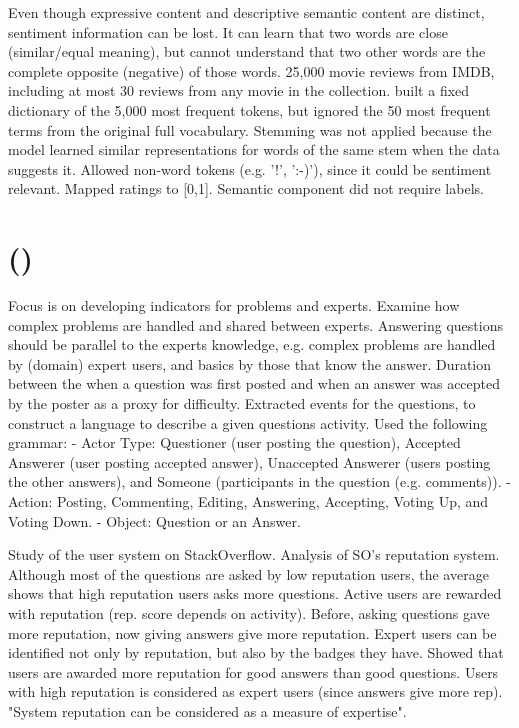 Even though expressive content and descriptive semantic content are distinct, sentiment information can be lost. It can learn that two words are close (similar/equal meaning), but cannot understand that two other words are the complete opposite (negative) of those words.
25,000 movie reviews from IMDB, including at most 30 reviews from any movie in the collection. built a fixed dictionary of the 5,000 most frequent tokens, but ignored the 50 most frequent terms from the original full vocabulary. Stemming was not applied because the model learned similar representations for words of the same stem when the data suggests it. Allowed non-word tokens (e.g. '!', ':-)'), since it could be sentiment relevant. Mapped ratings to [0,1]. Semantic component did not require labels.
\cite{Maas2011}	

\section{ ()}
\label{sec:stackoverflow}

Focus is on developing indicators for problems and experts. Examine how complex problems are handled and shared between experts. Answering questions should be parallel to the experts knowledge, e.g. complex problems are handled by (domain) expert users, and basics by those that know the answer. 
Duration between the when a question was first posted and when an answer was accepted by the poster as a proxy for difficulty. Extracted events for the questions, to construct a language to describe a given questions activity. Used the following grammar: 
-	Actor Type: Questioner (user posting the question), Accepted Answerer (user posting accepted answer), Unaccepted Answerer (users posting the other answers), and Someone (participants in the question (e.g. comments)). 
-	Action: Posting, Commenting, Editing, Answering, Accepting, Voting Up, and Voting Down. 
-	Object: Question or an Answer. 
\cite{Hanrahan2012}


Study of the user system on StackOverflow. Analysis of SO's reputation system. Although most of the questions are asked by low reputation users, the average shows that high reputation users asks more questions. 
Active users are rewarded with reputation (rep. score depends on activity). Before, asking questions gave more reputation, now giving answers give more reputation. Expert users can be identified not only by reputation, but also by the badges they have. Showed that users are awarded more reputation for good answers than good questions. Users with high reputation is considered as expert users (since answers give more rep).  "System reputation can be considered as a measure of expertise".    
\cite{Movshovitz-Attias2013}

